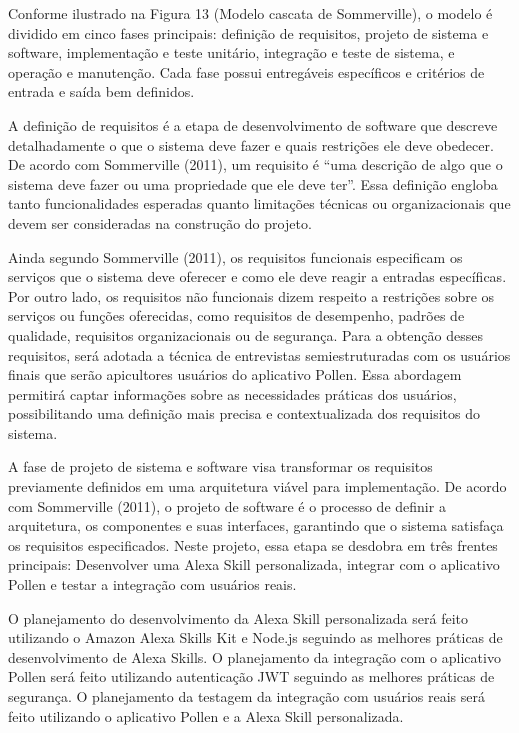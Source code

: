 Conforme ilustrado na Figura 13 (Modelo cascata de Sommerville), o modelo é dividido em cinco fases principais: definição de requisitos, 
projeto de sistema e software, implementação e teste unitário, integração e teste de sistema, e operação e manutenção. 
Cada fase possui entregáveis específicos e critérios de entrada e saída bem definidos.

\label{sssec:def-requisitos}

A definição de requisitos é a etapa de desenvolvimento de software que descreve detalhadamente o que o sistema deve fazer e quais restrições ele deve obedecer. 
De acordo com Sommerville (2011), um requisito é “uma descrição de algo que o sistema deve fazer ou uma propriedade que ele deve ter”. 
Essa definição engloba tanto funcionalidades esperadas quanto limitações técnicas ou organizacionais que devem ser consideradas na construção do projeto.

Ainda segundo Sommerville (2011), os requisitos funcionais especificam os serviços que o sistema deve oferecer e como ele deve reagir a entradas específicas. 
Por outro lado, os requisitos não funcionais dizem respeito a restrições sobre os serviços ou funções oferecidas, como requisitos de desempenho, padrões de qualidade, requisitos organizacionais ou de segurança. 
Para a obtenção desses requisitos, será adotada a técnica de entrevistas semiestruturadas com os usuários finais que serão apicultores usuários do aplicativo Pollen. 
Essa abordagem permitirá captar informações sobre as necessidades práticas dos usuários, possibilitando uma definição mais precisa e contextualizada dos requisitos do sistema.

\label{sssec:proj-sistema}

A fase de projeto de sistema e software visa transformar os requisitos previamente definidos em uma arquitetura viável para implementação. 
De acordo com Sommerville (2011), o projeto de software é o processo de definir a arquitetura, os componentes e suas interfaces, garantindo que o sistema satisfaça os requisitos especificados. 
Neste projeto, essa etapa se desdobra em três frentes principais: Desenvolver uma Alexa Skill personalizada, integrar com o aplicativo Pollen e testar a integração com usuários reais.

O planejamento do desenvolvimento da Alexa Skill personalizada será feito utilizando o Amazon Alexa Skills Kit e Node.js seguindo as melhores práticas de desenvolvimento de Alexa Skills.
O planejamento da integração com o aplicativo Pollen será feito utilizando autenticação JWT seguindo as melhores práticas de segurança.
O planejamento da testagem da integração com usuários reais será feito utilizando o aplicativo Pollen e a Alexa Skill personalizada.

